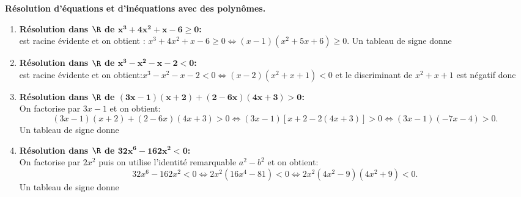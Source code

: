 
\begin{correction}  \; \textbf{R\'esolution d'\'equations et d'in\'equations avec des polyn\^{o}mes.}
\begin{enumerate}
\item \textbf{R\'esolution dans $\mathbf{\R}$ de $\mathbf{x^3+4x^2+x-6\geq 0 }$:}\\
 est racine \'evidente et on obtient : $x^3+4x^2+x-6\geq 0\Leftrightarrow (x-1)(x^2+5x+6)\geq 0$. Un tableau de signe donne 
\item \textbf{R\'esolution dans $\mathbf{\R}$ de $\mathbf{x^3-x^2-x-2<0}$:}\\
 est racine \'evidente et on obtient:$x^3-x^2-x-2<0\Leftrightarrow (x-2)(x^2+x+1)<0$ et le discriminant de $x^2+x+1$ est n\'egatif donc 
\item \textbf{R\'esolution dans $\mathbf{\R}$ de $\mathbf{(3x-1)(x+2)+(2-6x)(4x+3)>0}$:}\\
\noindent On factorise par $3x-1$ et on obtient: 
$$(3x-1)(x+2)+(2-6x)(4x+3)>0\Leftrightarrow (3x-1)\left\lbrack x+2-2(4x+3)\right\rbrack >0\Leftrightarrow (3x-1)(-7x-4)>0.$$ 
Un tableau de signe donne 
\item \textbf{R\'esolution dans $\mathbf{\R}$ de $\mathbf{32x^6-162x^2<0}$:}\\
\noindent On factorise par $2x^2$ puis on utilise l'identit\'e remarquable $a^2-b^2$ et on obtient: 
$$32x^6-162x^2<0\Leftrightarrow 2x^2(16x^4-81)<0\Leftrightarrow 2x^2( 4x^2-9 )(4x^2+9)<0.$$
Un tableau de signe donne 

\end{enumerate}
\end{correction}
